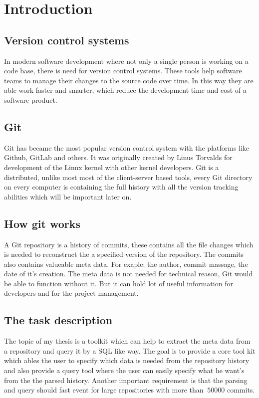\chapter{Introduction}
\label{ch:intro}

\section{Version control systems}
In modern software development where not only a single person is working on a code base, there is need for version control systems. 
These tools help software teams to manage their changes to the source code over time. 
In this way they are able work faster and smarter, which reduce the development time and cost of a software product.

\section{Git}
Git has became the most popular version control system with the platforms like Github\cite{dijkstra1979goto}, GitLab\cite{Gitlab} and others. 
It was originally created by Linus Torvalds \cite{linus} for development of the Linux kernel with other kernel developers. 
Git is a distributed, unlike most most of the client-server based tools, every Git directory on every computer is containing the full history with all the version tracking abilities which will be important later on.

\section{How git works}
A Git repository is a history of commits, these contains all the file changes which is needed to reconstruct the a specified version of the repository. 
The commits also contains valueable meta data. For exaple: the author, commit massage, the date of it's creation.
The meta data is not needed for technical reason, Git would be able to function without it. 
But it can hold lot of useful information for developers and for the project management.

\section{The task description}
The topic of my thesis is a toolkit which can help to extract the meta data from a repository and query it by a SQL like way. 
The goal is to provide a core tool kit which ables the user to specify which data is needed from the repository history and also provide a query tool where the user can easily specify what he want's from the the parsed history. 
Another important requirement is that the parsing and query should fast event for large repositories with more than \(~50000\) commits.

